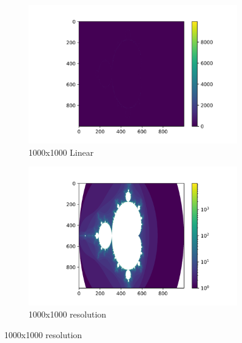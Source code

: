 \documentclass[12pt]{exam}
\begin{document}
\begin{enumerate}
\begin{figure}
                        \begin{subfigure}[b]{0.47\textwidth}
                            \includegraphics[width=\textwidth]{Linear_Scale.png}\hfill
                            \caption{1000x1000 Linear}
                            \label{fig:lin-res}
                        \end{subfigure}
                        \hfill
                        \begin{subfigure}[b]{0.47\textwidth}
                            \includegraphics[width=\textwidth]{High.png}\hfill
                            \caption{1000x1000 resolution}
                            \label{fig:high-res}
                        \end{subfigure}
                \end{figure}


\end{enumerate}
\end{document}
